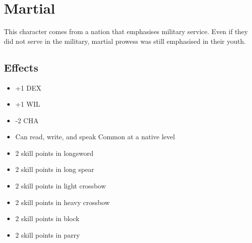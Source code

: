 \section{Martial}\label{culture:martial}
This character comes from a nation that emphasises military service. Even if
they did not serve in the military, martial prowess was still emphasised in
their youth.

\subsection*{Effects}
\begin{itemize}
    \item +1 DEX
    \item +1 WIL
    \item -2 CHA
    \item Can read, write, and speak Common at a native level
    \item 2 skill points in longsword
    \item 2 skill points in long spear
    \item 2 skill points in light crossbow
    \item 2 skill points in heavy crossbow
    \item 2 skill points in block
    \item 2 skill points in parry
\end{itemize}
